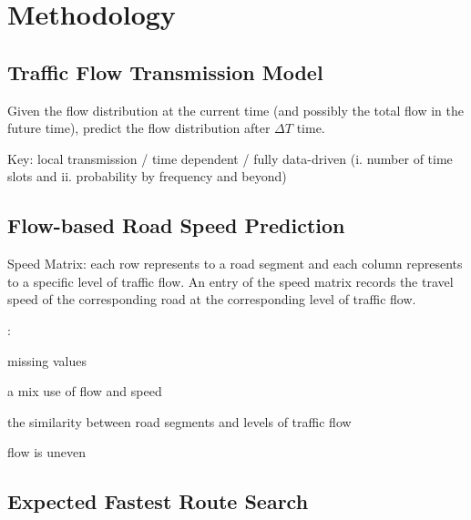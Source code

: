 \section{Methodology}
\label{sec-method}


\subsection{Traffic Flow Transmission Model}
\label{subsec-transmission}

Given the flow distribution at the current time (and possibly the total flow in the future time), predict the flow distribution after $\Delta T$ time.

Key: local transmission / time dependent / fully data-driven (i. number of time slots and ii. probability by frequency and beyond)


\subsection{Flow-based Road Speed Prediction}
\label{subsec-speed}

Speed Matrix: each row represents to a road segment and each column represents to a specific level of traffic flow. An entry of the speed matrix records the travel speed of the corresponding road at the corresponding level of traffic flow.


:
\bi
\item missing values
\item a mix use of flow and speed
\item the similarity between road segments and levels of traffic flow
\item flow is uneven
\ei

\subsection{Expected Fastest Route Search}
\label{subsec-route} 
